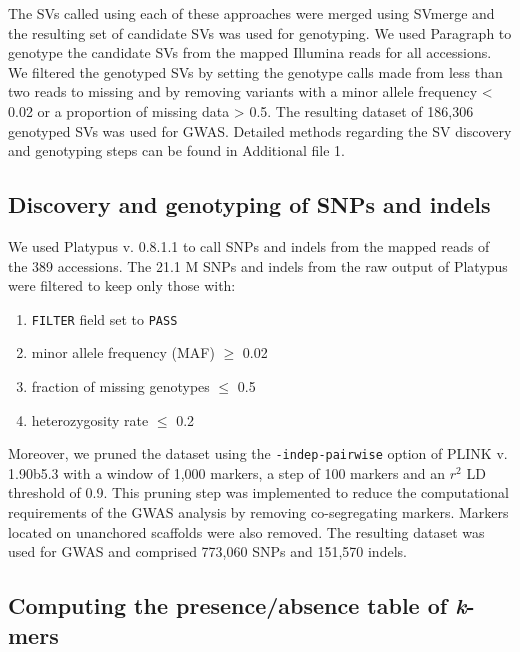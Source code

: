 \documentclass[doublespacing]{bmcart}
\begin{document}
The SVs called using each of these approaches were merged using SVmerge
\citep{wong2010} and the resulting set of candidate SVs was used for
genotyping. We used Paragraph \citep{chen2019} to genotype the candidate SVs
from the mapped Illumina reads for all accessions. We filtered the genotyped
SVs by setting the genotype calls made from less than two reads to missing and
by removing variants with a minor allele frequency < 0.02 or a proportion of
missing data > 0.5. The resulting dataset of 186,306 genotyped SVs was used for
GWAS. Detailed methods regarding the SV discovery and genotyping steps can be
found in Additional file 1.

\subsection*{Discovery and genotyping of SNPs and indels}

We used Platypus v. 0.8.1.1 \citep{rimmer2014} to call SNPs and indels from the
mapped reads of the 389 accessions. The 21.1 M SNPs and
indels from the raw output of Platypus were filtered to keep only those with:

\begin{enumerate}
	\item \texttt{FILTER} field set to \texttt{PASS}
	\item minor allele frequency (MAF) $\geq$ 0.02
	\item fraction of missing genotypes $\leq$ 0.5
	\item heterozygosity rate $\leq$ 0.2
\end{enumerate}

Moreover, we pruned the dataset using the \texttt{-\-indep-pairwise} option of
PLINK v. 1.90b5.3 \citep{purcell2007} with a window of 1,000 markers, a
step of 100 markers and an $r^2$ LD threshold of 0.9. This pruning step was
implemented to reduce the computational requirements of the GWAS analysis by
removing co-segregating markers. Markers located on unanchored scaffolds were
also removed. The resulting dataset was used for GWAS and comprised 773,060
SNPs and 151,570 indels.

\subsection*{Computing the presence/absence table of \emph{k}-mers}
\end{document}
